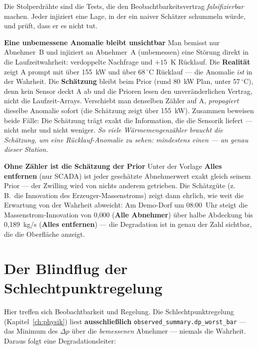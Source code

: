 \documentclass[11pt,a4paper,parskip=half]{scrreprt}
\newcommand{\ui}[1]{\textsf{\bfseries #1}}
\newcommand{\gC}{\,\ensuremath{{}^{\circ}\mathrm{C}}}
\newenvironment{beispiel}[1][Beispiel]
  {\par\medskip{\color{bsp}\hrule height 0.8pt}\nopagebreak\smallskip
   \noindent\textbf{\textsf{\textcolor{bsp}{#1}}}\quad\ignorespaces}
  {\par\nopagebreak\smallskip{\color{bsp}\hrule height 0.8pt}\par\medskip}
\begin{document}
Die Stolperdrähte sind die Tests, die den Beobachtbarkeitsvertrag
\emph{falsifizierbar} machen. Jeder injiziert eine Lage, in der ein naiver
Schätzer schummeln würde, und prüft, dass er es nicht tut.

\begin{beispiel}[Eine unbemessene Anomalie bleibt unsichtbar]
Man bemisst nur Abnehmer~B und injiziert an Abnehmer~A (unbemessen) eine
Störung direkt in die Laufzeitwahrheit: verdoppelte Nachfrage und $+15$~K
Rücklauf. Die \ui{Realität} zeigt A prompt mit über 155~kW und über 68\gC{}
Rücklauf --- die Anomalie \emph{ist} in der Wahrheit. Die \ui{Schätzung} bleibt
beim Prior (rund 80~kW Plan, unter 57\gC), denn kein Sensor deckt A ab und die
Prioren lesen den unveränderlichen Vertrag, nicht die Laufzeit-Arrays.
Verschiebt man denselben Zähler auf A, \emph{propagiert} dieselbe Anomalie
sofort (die Schätzung zeigt über 155~kW). Zusammen beweisen beide Fälle: Die
Schätzung trägt exakt die Information, die die Sensorik liefert --- nicht mehr
und nicht weniger. \emph{So viele Wärmemengenzähler braucht die Schätzung, um
eine Rücklauf-Anomalie zu sehen: mindestens einen --- an genau dieser Station.}
\end{beispiel}

\begin{beispiel}[Ohne Zähler ist die Schätzung der Prior]
Unter der Vorlage \ui{Alles entfernen} (nur SCADA) ist jeder geschätzte
Abnehmerwert exakt gleich seinem Prior --- der Zwilling wird von nichts anderem
getrieben. Die Schätzgüte (z.\,B.\ die Innovation des Erzeuger-Massenstroms)
zeigt dann ehrlich, wie weit die Erwartung von der Wahrheit abweicht: Am
Demo-Dorf um 08:00~Uhr steigt die Massenstrom-Innovation von 0{,}000
(\ui{Alle Abnehmer}) über halbe Abdeckung bis 0{,}189~kg/s (\ui{Alles
entfernen}) --- die Degradation ist in genau der Zahl sichtbar, die die
Oberfläche anzeigt.
\end{beispiel}

\section{Der Blindflug der Schlechtpunktregelung}
\label{sec:blindflug}

Hier treffen sich Beobachtbarkeit und Regelung. Die Schlechtpunktregelung
(Kapitel~\ref{ch:physik}) liest \textbf{ausschließlich}
\texttt{observed\_summary.dp\_worst\_bar} --- das Minimum des $\Delta p$ über
die \emph{bemessenen} Abnehmer --- niemals die Wahrheit. Daraus folgt eine
Degradationsleiter:
\end{document}
